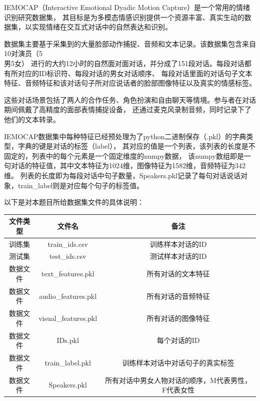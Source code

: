 \documentclass[11pt]{article}
\begin{document}
    IEMOCAP（Interactive Emotional Dyadic Motion Capture）是一个常用的情绪识别研究数据集，
    其目标是为多模态情感识别提供一个资源丰富、真实生动的数据集，以实现情绪在交互式对话中的自然表达和识别。

    数据集主要基于采集到的大量脸部动作捕捉、音频和文本记录。该数据集包含来自10对演员（5\\男5女）
    进行的大约12小时的自然面对面对话，并分成了151段对话。每段对话都有所对应的ID标识符、每段对话的男女对话顺序、
    每段对话里面的对话句子文本特征、音频特征和该对话句子所对应说话者的脸部图像特征以及真实的情感标签。

    这些对话场景包括了两人的合作任务、角色扮演和自由聊天等情境。参与者在对话期间佩戴了高精度的面部表情捕捉设备，
    还通过麦克风录制音频，同时记录下了他们的文本转录。

    IEMOCAP数据集中每种特征已经预处理为了python二进制保存（.pkl）的字典类型，字典的键是对话的标签（label），
    其对应的值是一个列表，该列表的长度是不固定的，列表中的每个元素是一个固定维度的numpy数据，
    该numpy数组即是一句对话的特征值，其中文本特征为1024维，图像特征为1582维，音频特征为342维。
    列表的长度即为每段对话中句子数量，Speakers.pkl记录了每句对话说话对象，train\_label则是对应每个句子的标签值。
    
    以下是对本题目所给数据集文件的具体说明：
    \begin{center}
        \begin{tabular}{|c|c|c|}
            \hline
            \textbf{文件类型} & \textbf{文件名} & \textbf{备注} \\
            \hline
            训练集 & train\_ids.csv & 训练样本对话的ID\\
            \hline
            测试集 & test\_ids.csv & 测试样本对话的ID\\
            \hline
            数据文件 & text\_features.pkl & 所有对话的文本特征\\
            \hline
            数据文件 & audio\_features.pkl & 所有对话的音频特征\\
            \hline
            数据文件 & visual\_features.pkl & 所有对话的图像特征\\
            \hline
            数据文件 & IDs.pkl & 每个对话的ID\\
            \hline
            数据文件 & train\_label.pkl & 训练样本对话中对话句子的真实标签\\
            \hline
            数据文件 & Speakers.pkl & 所有对话中男女人物对话的顺序，M代表男性，F代表女性\\
            \hline
        \end{tabular}     
    \end{center}
\end{document}
